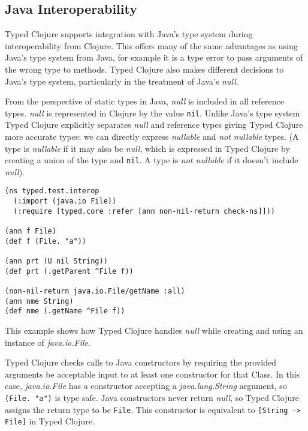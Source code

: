 \subsection{Java Interoperability}
\label{sec:javainterop}

Typed Clojure supports integration with Java's type system during
interoperability from Clojure. This offers many of the same advantages
as using Java's type system from Java, for example it is a type
error to pass arguments of the wrong type to methods.
Typed Clojure also makes different decisions to Java's type system,
particularly in the treatment of Java's \emph{null}.

From the perspective of static types in Java, \emph{null} is included in all reference types.
\emph{null} is represented in Clojure by the value \lstinline|nil|. Unlike Java's type system
Typed Clojure explicitly separates \emph{null} and reference types giving Typed Clojure 
more accurate types: we can directly express \emph{nullable} and \emph{not nullable} types.
(A type is \emph{nullable} if it may also be \emph{null},
which is expressed in Typed Clojure by creating a union of the type and \lstinline|nil|.
A type is \emph{not nullable} if it doesn't include \emph{null}).

\begin{lstlisting}[caption=Java interoperability with Typed Clojure]
(ns typed.test.interop
  (:import (java.io File))
  (:require [typed.core :refer [ann non-nil-return check-ns]]))

(ann f File)
(def f (File. "a"))

(ann prt (U nil String))
(def prt (.getParent ^File f))

(non-nil-return java.io.File/getName :all)
(ann nme String)
(def nme (.getName ^File f))

\end{lstlisting}

This example shows how Typed Clojure handles \emph{null} while creating and
using an instance of \emph{java.io.File}.

Typed Clojure checks calls to Java constructors by requiring the provided
arguments be acceptable input to at least one constructor for that Class.
In this case, \emph{java.io.File} has a constructor accepting a \emph{java.lang.String}
argument, so \lstinline|(File. "a")| is type safe. Java constructors never
return \emph{null}, so Typed Clojure assigns the return type to be \lstinline|File|.
This constructor is equivalent to \lstinline|[String -> File]| in Typed Clojure.

